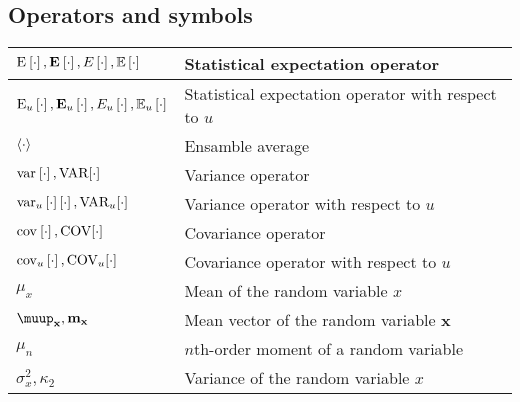 \documentclass{article}
\begin{document}
\subsection{Operators and symbols}
\begin{xltabular}{\textwidth}{XX}
    \(\E{\cdot}, \nossekE{\cdot}, E\left[ \cdot \right], \mathbb{E}\left[ \cdot \right]\)               & Statistical expectation operator \cite{nossekAdaptiveArraySignal2015,dinizAdaptiveFilteringAlgorithms2002}\\ \hline
    \(\E[u]{\cdot}, \nossekE[u]{\cdot},  E_u\left[ \cdot \right], \mathbb{E}_u\left[ \cdot \right]\)    & Statistical expectation operator with respect to \(u\)\\ \hline
    \(\expval{\cdot}\)                                                                                  & Ensamble average\\ \hline
    \(\var{\cdot}, \textnormal{VAR}[\cdot]\)                                                            & Variance operator \cite{haykinAdaptiveFilterTheory2002,leon-garciaProbabilityStatisticsRandom2007,proakisDigitalCommunications2007,bishopPatternRecognitionMachine2006}\\ \hline
    \(\var[u]{\cdot} \left[ \cdot \right], \textnormal{VAR}_u[\cdot]\)                                  & Variance operator with respect to \(u\)\\ \hline
    \(\cov{\cdot}, \textnormal{COV}[\cdot]\)                                                            & Covariance operator \cite{bishopPatternRecognitionMachine2006}\\ \hline
    \(\cov[u]{\cdot}, \textnormal{COV}_u[\cdot]\)                                                       & Covariance operator with respect to \(u\)\\ \hline
    \(\mu_x\)                                                                                           & Mean of the random variable \(x\) \\ \hline
    \(\boldsymbol{\muup}_\mathbf{x}, \mathbf{m}_\mathbf{x}\)                                            & Mean vector of the random variable \(\mathbf{x}\) \cite{brownIntroductionRandomSignals1997} \\ \hline
    \(\mu_n\)                                                                                           & \(n\)th-order moment of a random variable \\ \hline
    \(\sigma_x^2, \kappa_2\)                                                                            & Variance of the random variable \(x\)\\ \hline

\end{xltabular}
\end{document}
